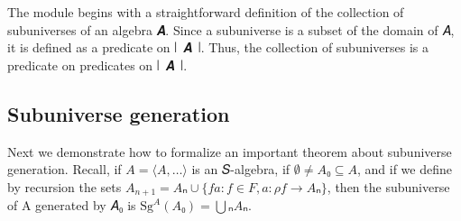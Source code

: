 \documentclass[sigplan,screen]{acmart}
\begin{document}

The module begins with a straightforward definition of the collection of subuniverses of an algebra 𝑨. Since a subuniverse is a subset of the domain of 𝐴, it is defined as a predicate on ∣~𝑨~∣. Thus, the collection of subuniverses is a predicate on predicates on ∣~𝑨~∣.
\begin{code}\end{code}

\begin{comment}
Before describing subuniverse generation, we will need to dispense with some more technicalities.
\begin{code}\end{code}
\end{comment}


\subsection{Subuniverse generation}\label{subuniverse-generation}
Next we demonstrate how to formalize an important theorem about subuniverse generation. Recall, if \(A = ⟨𝐴, …⟩\) is an 𝑆-algebra, if \(∅ ≠ 𝐴₀ ⊆ 𝐴\), and if we define by recursion the sets \(A_{n+1} = Aₙ ∪ \{ f a : f ∈ F, a : ρ f → Aₙ \}\), then the subuniverse of A generated by 𝐴₀ is \(\mathrm{Sg}^A(A₀) = ⋃ₙ Aₙ\).
\begin{code}\end{code}
\end{document}
